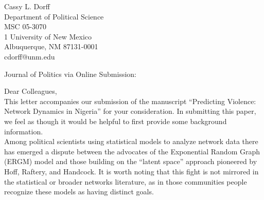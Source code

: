 \documentclass[letterpaper]{article}
\begin{document}
\thispagestyle{empty}

\begin{minipage}{0.64\linewidth}
Cassy L. Dorff\\ 
Department of Political Science   \\ 
MSC 05-3070\\
1 University of New Mexico\\
Albuquerque, NM 87131-0001 \\ 
cdorff@unm.edu 
\end{minipage}


 
  
\vspace{0.5in}

Journal of Politics via Online Submission:

\vspace{0.5in}

Dear Colleagues,\\[1ex]

This letter accompanies our submission of the manuscript ``Predicting Violence: Network Dynamics in Nigeria'' for your consideration. In submitting this paper, we feel as though it would be helpful to first provide some background information. \\

Among political scientists using statistical models to analyze network data there has emerged a dispute between the advocates of the Exponential Random Graph (ERGM) model and those building on the ``latent space'' approach pioneered by Hoff, Raftery, and Handcock. It is worth noting that this fight is not mirrored in the statistical or broader networks literature, as in those communities people recognize these models as having distinct goals.\\
\end{document}
